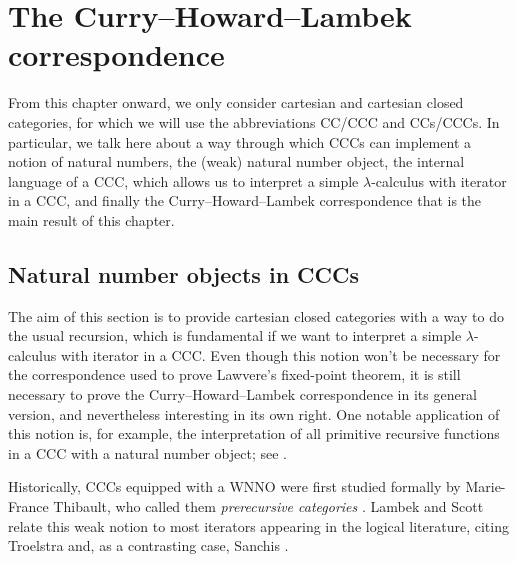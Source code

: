 \chapter{The Curry--Howard--Lambek correspondence}

From this chapter onward, we only consider cartesian and cartesian closed categories, for which we will use the abbreviations CC/CCC and CCs/CCCs. In particular,
we talk here about a way through which CCCs can implement a notion of natural numbers, the (weak) natural number object, the internal language of a CCC,
which allows us to interpret a simple $\lambda$-calculus with iterator in a CCC, and finally the Curry--Howard--Lambek correspondence that is the main result of this chapter.

\section{Natural number objects in CCCs}
The aim of this section is to provide cartesian closed categories with a way to do the usual recursion,
which is fundamental if we want to interpret a simple $\lambda$-calculus with iterator in a CCC.
Even though this notion won't be necessary for the correspondence used to prove Lawvere's fixed-point theorem,
it is still necessary to prove the Curry--Howard--Lambek correspondence in its general version, and nevertheless
interesting in its own right. One notable application of this notion is, for example, the interpretation of all primitive recursive functions in a CCC with a natural number object; see \cite[Part~III, \S\S~1--2]{LambekScott1994}.

Historically, CCCs equipped with a WNNO were first studied formally by Marie-France Thibault, who called them \emph{prerecursive categories} \parencite{Thibault1977,Thibault1982}. Lambek and Scott relate this weak notion to most iterators appearing in the logical literature, citing Troelstra and, as a contrasting case, Sanchis \parencite[Part~I, p.~47]{LambekScott1994}\parencite{Troelstra1973,Sanchis1967}.

